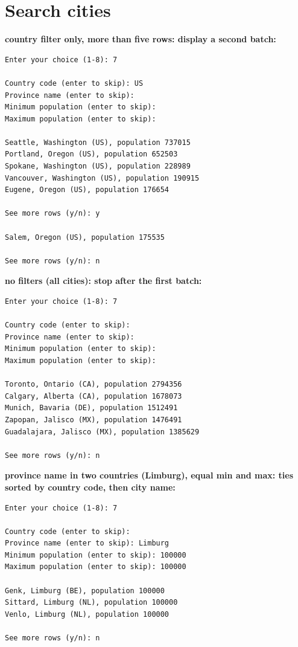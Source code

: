 \documentclass[11pt]{article}
\begin{document}
\section*{Search cities}

\noindent \textbf{country filter only, more than five rows: display a second batch:}
{\small
\begin{verbatim}
Enter your choice (1-8): 7

Country code (enter to skip): US
Province name (enter to skip): 
Minimum population (enter to skip): 
Maximum population (enter to skip): 

Seattle, Washington (US), population 737015
Portland, Oregon (US), population 652503
Spokane, Washington (US), population 228989
Vancouver, Washington (US), population 190915
Eugene, Oregon (US), population 176654

See more rows (y/n): y

Salem, Oregon (US), population 175535

See more rows (y/n): n
\end{verbatim}
}

\noindent \textbf{no filters (all cities): stop after the first batch:}
{\small
\begin{verbatim}
Enter your choice (1-8): 7

Country code (enter to skip): 
Province name (enter to skip): 
Minimum population (enter to skip): 
Maximum population (enter to skip): 

Toronto, Ontario (CA), population 2794356
Calgary, Alberta (CA), population 1678073
Munich, Bavaria (DE), population 1512491
Zapopan, Jalisco (MX), population 1476491
Guadalajara, Jalisco (MX), population 1385629

See more rows (y/n): n
\end{verbatim}
}

\noindent \textbf{province name in two countries (Limburg), equal min and max: ties sorted by country code, then city name:}
{\small
\begin{verbatim}
Enter your choice (1-8): 7

Country code (enter to skip): 
Province name (enter to skip): Limburg
Minimum population (enter to skip): 100000
Maximum population (enter to skip): 100000

Genk, Limburg (BE), population 100000
Sittard, Limburg (NL), population 100000
Venlo, Limburg (NL), population 100000

See more rows (y/n): n
\end{verbatim}
}
\end{document}
